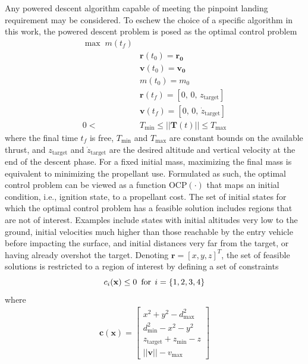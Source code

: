 Any powered descent algorithm capable of meeting the pinpoint landing requirement may be considered. To eschew the choice of a specific algorithm in this work, the powered descent problem is posed as the optimal control problem
\begin{align}
\max \;m(t_f) \label{eq_srp_ocp}\\
&\mathbf{r}(t_0) = \mathbf{r_0} \\
&\mathbf{v}(t_0) = \mathbf{v_0} \\
&m(t_0) = m_0\\
&\mathbf{r}(t_f) = [0,\, 0,\, z_{\mathrm{target}}] \\
&\mathbf{v}(t_f) = [0,\, 0,\, \dot{z}_{\mathrm{target}}] \\
0 <\,\, &T_{\min} \le ||\mathbf{T}(t)|| \le T_{\max}
\end{align}
where the final time $t_f$ is free, $T_{\min}$ and $ T_{\max} $ are constant bounds on the available thrust, and $z_{\mathrm{target}}$ and $\dot{z}_{\mathrm{target}}$ are the desired altitude and vertical velocity at the end of the descent phase. For a fixed initial mass, maximizing the final mass is equivalent to minimizing the propellant use. Formulated as such, the optimal control problem can be viewed as a function $\mathrm{OCP}(\cdot)$ that maps an initial condition, i.e., ignition state, to a propellant cost. 
The set of initial states for which the optimal control problem has a feasible solution includes regions that are not of interest. Examples include states with initial altitudes very low to the ground, initial velocities much higher than those reachable by the entry vehicle before impacting the surface, and initial distances very far from the target, or having already overshot the target. Denoting $\mathbf{r} = [x,y,z]^T$, the set of feasible solutions is restricted to a region of interest by defining a set of constraints
\begin{equation}
c_i(\mathbf{x})\le 0\:\; \mathrm{for}\,\;i=\{1,2,3,4\}\\
\end{equation} where 
\begin{align}
\mathbf{c}(\mathbf{x}) = \left[ \begin{array}{lc}
        x^2 + y^2 - d^2_{\max}\\
        d^2_{\min} - x^2 - y^2\\
        z_{\mathrm{target}} + z_{\min} - z \\
        ||\textbf{v}|| - v_{\max}
        \end{array} \right]\label{eq_constraints} 
\end{align} 
